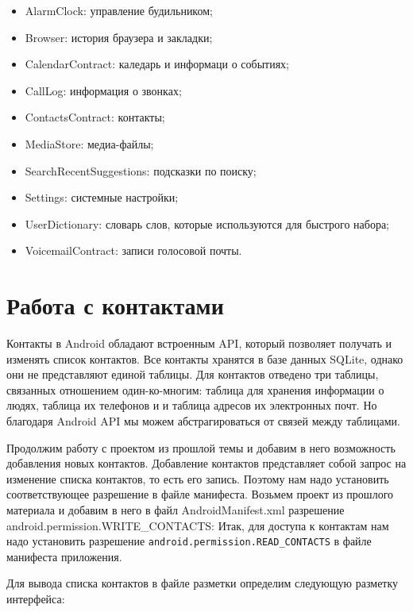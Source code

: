 \begin{itemize}
	\item AlarmClock: управление будильником;
	\item Browser: история браузера и закладки;
	\item CalendarContract: каледарь и информаци о событиях;
	\item CallLog: информация о звонках;
	\item ContactsContract: контакты;
	\item MediaStore: медиа-файлы;
	\item SearchRecentSuggestions: подсказки по поиску;
	\item Settings: системные настройки;
	\item UserDictionary: словарь слов, которые используются
		для быстрого набора;
	\item VoicemailContract: записи голосовой почты.
\end{itemize}

\section{Работа с контактами}
Контакты в Android обладают встроенным API, который позволяет получать
и изменять список контактов. Все контакты хранятся в базе данных SQLite,
однако они не представляют единой таблицы. Для контактов отведено три
таблицы, связанных отношением один-ко-многим: таблица для хранения
информации о людях, таблица их телефонов и и таблица адресов их
электронных почт. Но благодаря Android API мы можем абстрагироваться от
связей между таблицами.\par
Продолжим работу с проектом из прошлой темы и добавим в него
возможность добавления новых контактов. Добавление контактов
представляет собой запрос на изменение списка контактов, то есть его
запись. Поэтому нам надо установить соответствующее разрешение в файле
манифеста. Возьмем проект из прошлого материала и добавим в него в файл
AndroidManifest.xml разрешение android.permission.WRITE\_CONTACTS:
Итак, для доступа к контактам нам надо установить разрешение
\texttt{android.permission.READ\_CONTACTS} в файле манифеста приложения.\par
Для вывода списка контактов в файле разметки определим
следующую разметку интерфейса:

